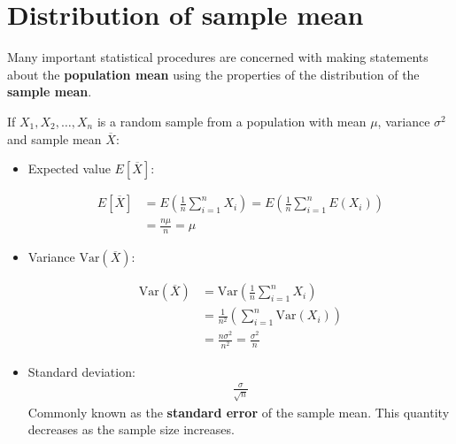 \documentclass[10pt,a4paper]{article}
\begin{document}
\section{Distribution of sample mean}

Many important statistical procedures are concerned with making statements about the \textbf{population
mean} using the properties of the distribution of the \textbf{sample mean}.

If $X_1, X_2,\dots, X_n$ is a random sample from a population with mean $\mu$, variance $\sigma^2$
and sample mean $\overline{X}$:
\begin{itemize}
    \item Expected value $E[\overline{X}]$:
    \begin{tcolorbox}[breakable,colback=white]
        \begin{align*}
            E[\overline{X}] &= E\left(\frac{1}{n}\sum_{i=1}^n X_i\right) = E\left(\frac{1}{n}\sum_{i=1}^n E(X_i)\right) \\
            &= \frac{n \mu}{n} = \mu
        \end{align*}
    \end{tcolorbox}
    \item Variance $\text{Var}(\overline{X})$:
    \begin{tcolorbox}[breakable,colback=white]
    \begin{align*}
        \text{Var}(\overline{X}) &= \text{Var}\left(\frac{1}{n}\sum_{i=1}^n X_i\right) \\
        &= \frac{1}{n^2}\left(\sum_{i=1}^n \text{Var}(X_i)\right) \\
        &= \frac{n\sigma^2}{n^2} = \frac{\sigma^2}{n}
    \end{align*}
    \end{tcolorbox}
    \item Standard deviation:
    \begin{align*}
        \frac{\sigma}{\sqrt{n}}
    \end{align*}
    Commonly known as the \textbf{standard error} of the sample mean. This quantity decreases as the
    sample size increases.
\end{itemize}
\end{document}
